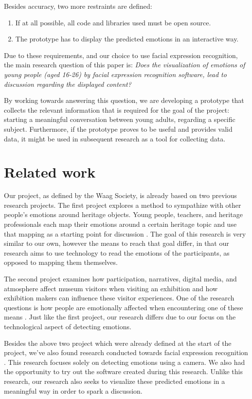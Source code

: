 \documentclass[sigconf]{acmart}
\begin{document}
Besides accuracy, two more restraints are defined:
\begin{enumerate}
    \item{If at all possible, all code and libraries used must be open source.}
    \item{The prototype has to display the predicted emotions in an interactive way.}
\end{enumerate}
Due to these requirements, and our choice to use facial expression recognition, the main research question
of this paper is: \emph{Does the visualization of emotions of young people (aged 16-26) by facial expression
recognition software, lead to discussion regarding the displayed content?}

By working towards answering this question, we are developing a prototype that collects the relevant information
that is required for the goal of the project: starting a meaningful conversation between young adults, regarding
a specific subject. Furthermore, if the prototype proves to be useful and provides valid data, it might be used in subsequent
research as a tool for collecting data.


\section{Related work}
Our project, as defined by the Waag Society, is already based on two previous research projects. The first
project explores a method to sympathize with other people's emotions around heritage objects. Young people,
teachers, and heritage professionals each map their emotions around a certain heritage topic and use that
mapping as a starting point for discussion \cite{emotionnetworking2017}. The goal of this research is very
similar to our own, however the means to reach that goal differ, in that our research aims to use technology
to read the emotions of the participants, as opposed to mapping them themselves.

The second project examines how participation, narratives, digital media, and atmosphere affect museum 
visitors when visiting an exhibition and how exhibition makers can influence these visitor experiences. 
One of the research questions is how people are emotionally affected when encountering one of 
these means \cite{}. Just like the first project, our research differs due to our focus on the technological
aspect of detecting emotions.

Besides the above two project which were already defined at the start of the project, we've also found research
conducted towards facial expression recognition \cite{den2005facereader}. This research focuses solely on
detecting emotions using a camera. We also had the opportunity to try out the software created during this
research. Unlike this research, our research also seeks to visualize these predicted emotions in a meaningful
way in order to spark a discussion.
\end{document}
